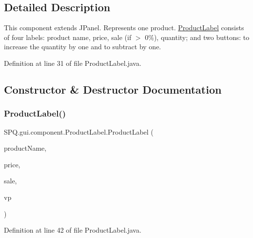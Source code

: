 \subsection{Detailed Description}
This component extends J\+Panel. Represents one product. \mbox{\hyperlink{class_s_p_q_1_1gui_1_1component_1_1_product_label}{Product\+Label}} consists of four labels\+: product name, price, sale (if $>$ 0\%), quantity; and two buttons\+: to increase the quantity by one and to subtract by one. 

Definition at line 31 of file Product\+Label.\+java.



\subsection{Constructor \& Destructor Documentation}
\mbox{\label{class_s_p_q_1_1gui_1_1component_1_1_product_label_a39cba3384790cdbcb8dc6d9e60d01196}} 
\subsubsection{\texorpdfstring{Product\+Label()}{ProductLabel()}\hspace{0.1cm}{\footnotesize\ttfamily [1/2]}}
{\footnotesize\ttfamily S\+P\+Q.\+gui.\+component.\+Product\+Label.\+Product\+Label (\begin{DoxyParamCaption}\item[{String}]{product\+Name,  }\item[{String}]{price,  }\item[{String}]{sale,  }\item[{\mbox{\hyperlink{class_s_p_q_1_1gui_1_1_ventana_principal}{Ventana\+Principal}}}]{vp }\end{DoxyParamCaption})}



Definition at line 42 of file Product\+Label.\+java.

\mbox{\label{class_s_p_q_1_1gui_1_1component_1_1_product_label_ad2a715926b802401b162793f217a26f7}} 
